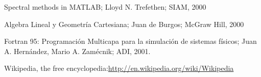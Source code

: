 \documentclass[10pt,fleqn,a4]{book}
\begin{document}
\begin{thebibliography}{99}

  Spectral methods in MATLAB; Lloyd N. Trefethen; SIAM, 2000


  Algebra Lineal y Geometría Cartesiana; Juan de Burgos; McGraw Hill,
  2000


  Fortran 95: Programación Multicapa para la simulación de sistemas
  físicos; Juan A. Hernández, Mario A. Zamécnik; ADI, 2001.


  Wikipedia, the free encyclopedia:\url{http://en.wikipedia.org/wiki/Wikipedia}

\end{thebibliography}





\printindex{}
\end{document}
